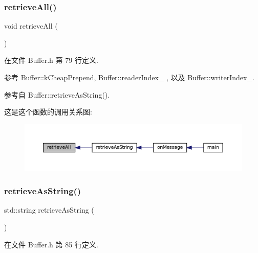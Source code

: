\subsubsection{\texorpdfstring{retrieve\+All()}{retrieveAll()}}
{\footnotesize\ttfamily void retrieve\+All (\begin{DoxyParamCaption}{ }\end{DoxyParamCaption})\hspace{0.3cm}{\ttfamily [inline]}}



在文件 Buffer.\+h 第 79 行定义.



参考 Buffer\+::k\+Cheap\+Prepend, Buffer\+::reader\+Index\+\_\+ , 以及 Buffer\+::writer\+Index\+\_\+.



参考自 Buffer\+::retrieve\+As\+String().

这是这个函数的调用关系图\+:
\nopagebreak
\begin{figure}[H]
\begin{center}
\leavevmode
\includegraphics[width=350pt]{classmuduo_1_1Buffer_af505ce71f8935bcfaa932d304c295173_icgraph}
\end{center}
\end{figure}
\mbox{\label{classmuduo_1_1Buffer_a49c703048227a7c666fca7514b60892e}} 
\subsubsection{\texorpdfstring{retrieve\+As\+String()}{retrieveAsString()}}
{\footnotesize\ttfamily std\+::string retrieve\+As\+String (\begin{DoxyParamCaption}{ }\end{DoxyParamCaption})\hspace{0.3cm}{\ttfamily [inline]}}



在文件 Buffer.\+h 第 85 行定义.



